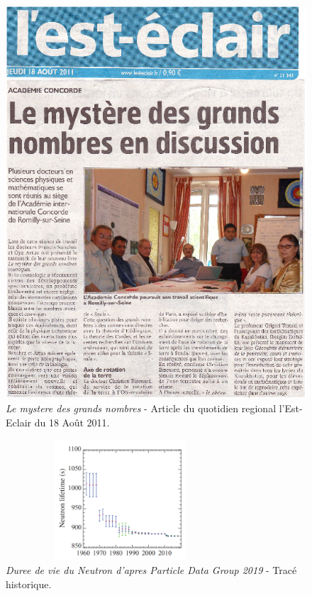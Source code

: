 \documentclass[a4paper,12pt]{article}
\begin{document}
\begin{appendix}
\begin{figure}
\centering
\includegraphics{./figures/lesteclair.png}
\caption [L'est-Eclair: Le mystere des grands nombres]{\textit{Le mystere des grands nombres} - Article du quotidien regional l'Est-Eclair du 18 Ao\^ut 2011.} 
\label{fig:5:figure5}
\end{figure}


\begin{figure}
\centering
\includegraphics[width=8.5cm,height=4.5cm]{./figures/neutron-lifetime-pdg.png}
\caption[Mesures de la duree de vie du neutron depuis 1962]{\textit{Duree de vie du Neutron d'apres Particle Data Group 2019} - Tracé historique.} 
\label{fig:6:figure6}
\end{figure}


\end{appendix}
\end{document}
